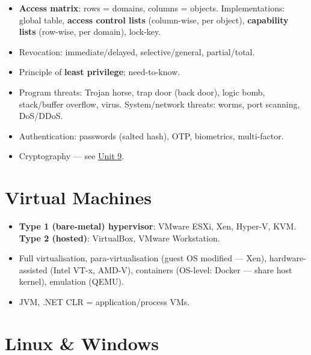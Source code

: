 \begin{itemize}
\tightlist
\item
  \textbf{Access matrix}: rows = domains, columns = objects. Implementations: global table, \textbf{access control lists} (column-wise, per object), \textbf{capability lists} (row-wise, per domain), lock-key.
\item
  Revocation: immediate/delayed, selective/general, partial/total.
\item
  Principle of \textbf{least privilege}; need-to-know.
\item
  Program threats: Trojan horse, trap door (back door), logic bomb, stack/buffer overflow, virus. System/network threats: worms, port scanning, DoS/DDoS.
\item
  Authentication: passwords (salted hash), OTP, biometrics, multi-factor.
\item
  Cryptography --- see \protect\hyperlink{p2-09}{Unit 9}.
\end{itemize}

\needspace{95pt}

\hypertarget{p2-05--11-virtual-machines}{%
\section{Virtual Machines}\label{p2-05--11-virtual-machines}}

\begin{itemize}
\tightlist
\item
  \textbf{Type 1 (bare-metal) hypervisor}: VMware ESXi, Xen, Hyper-V, KVM. \textbf{Type 2 (hosted)}: VirtualBox, VMware Workstation.
\item
  Full virtualisation, para-virtualisation (guest OS modified --- Xen), hardware-assisted (Intel VT-x, AMD-V), containers (OS-level: Docker --- share host kernel), emulation (QEMU).
\item
  JVM, .NET CLR = application/process VMs.
\end{itemize}

\needspace{130pt}

\hypertarget{p2-05--12-linux--windows}{%
\section{Linux \& Windows}\label{p2-05--12-linux--windows}}

\begingroup\small

